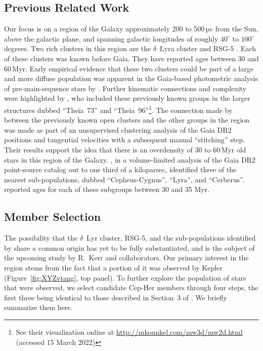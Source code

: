 \documentclass[12pt,twocolumn,linenumbers]{aastex63}
\begin{document}
\subsection{Previous Related Work}

Our focus is on a region of the Galaxy approximately 200 to 500\,pc
from the Sun, above the galactic plane, and spanning galactic
longitudes of roughly $40^\circ$ to $100^\circ$ degrees.  Two rich
clusters in this region are the $\delta$~Lyra cluster
\citep{stephenson_possible_1959} and RSG-5 \citep{roser_nine_2016}.
Each of these clusters was known before Gaia.  They have reported ages
between 30 and 60\,Myr.  Early empirical
evidence that these two clusters could be part of a large and more
diffuse population was apparent in the Gaia-based photometric analysis
of pre-main-sequence stars by \citet[][see their Figures~11
and~13]{Zari2018}.  Further kinematic connections and complexity were
highlighted by \citet{KounkelCovey2019}, who included these previously
known groups in the larger structures dubbed ``Theia~73'' and
``Theia~96''\footnote{See their visualization online at
\url{http://mkounkel.com/mw3d/mw2d.html} (accessed 15 March 2022)}.
The connection made by \citet{KounkelCovey2019} between the previously
known open clusters and the other groups in the region was made as
part of an unsupervised clustering analysis of the Gaia DR2 positions
and tangential velocities with a subsequent manual ``stitching'' step.
Their results support the idea that there is an overdensity of
30 to 60\,Myr old stars in this region of
the Galaxy.  \citet{Kerr2021}, in a volume-limited analysis of the
Gaia DR2 point-source catalog out to one third of a kiloparsec,
identified three of the nearest sub-populations, dubbed
``Cepheus-Cygnus'', ``Lyra'', and ``Cerberus''.  \citet{Kerr2021}
reported ages for each of these subgroups between 30 and 35 Myr.


\subsection{Member Selection}
\label{subsec:members}


The possibility that the $\delta$~Lyr cluster, RSG-5, and the
sub-populations identified by \citet{Kerr2021} share a common origin
has yet to be fully substantiated, and is the subject of the upcoming
study by R.~Kerr and collaborators.  Our primary interest in the
region stems from the fact that a portion of it was observed by Kepler
(Figure~\ref{fig:XYZvtang}, top panel).  To further explore the
population of stars that were observed, we select candidate Cep-Her
members through four steps, the first three being identical to those
described in Section~3 of \citet{Kerr2021}.  We briefly summarize them
here.
\end{document}
